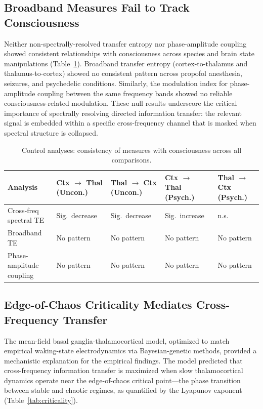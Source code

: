 \documentclass[12pt]{article}
\begin{document}
\subsection{Broadband Measures Fail to Track Consciousness}

Neither non-spectrally-resolved transfer entropy nor phase-amplitude coupling showed consistent relationships with consciousness across species and brain state manipulations (Table~\ref{tab:controls}). Broadband transfer entropy (cortex-to-thalamus and thalamus-to-cortex) showed no consistent pattern across propofol anesthesia, seizures, and psychedelic conditions. Similarly, the modulation index for phase-amplitude coupling between the same frequency bands showed no reliable consciousness-related modulation. These null results underscore the critical importance of spectrally resolving directed information transfer: the relevant signal is embedded within a specific cross-frequency channel that is masked when spectral structure is collapsed.

\begin{table}[H]
\centering
\caption{Control analyses: consistency of measures with consciousness across all comparisons.}
\label{tab:controls}
\begin{tabular}{lllll}
\toprule
Analysis & Ctx $\to$ Thal (Uncon.) & Thal $\to$ Ctx (Uncon.) & Ctx $\to$ Thal (Psych.) & Thal $\to$ Ctx (Psych.) \\
\midrule
Cross-freq spectral TE & Sig.\ decrease & Sig.\ decrease & Sig.\ increase & n.s. \\
Broadband TE & No pattern & No pattern & No pattern & No pattern \\
Phase-amplitude coupling & No pattern & No pattern & No pattern & No pattern \\
\bottomrule
\end{tabular}
\end{table}

\subsection{Edge-of-Chaos Criticality Mediates Cross-Frequency Transfer}

The mean-field basal ganglia-thalamocortical model, optimized to match empirical waking-state electrodynamics via Bayesian-genetic methods, provided a mechanistic explanation for the empirical findings. The model predicted that cross-frequency information transfer is maximized when slow thalamocortical dynamics operate near the edge-of-chaos critical point---the phase transition between stable and chaotic regimes, as quantified by the Lyapunov exponent (Table~\ref{tab:criticality}).
\end{document}
